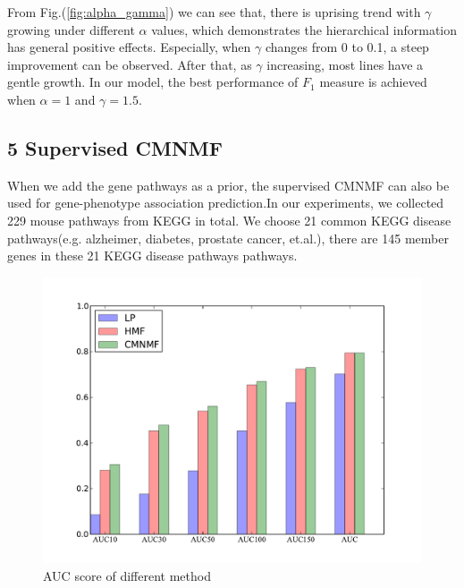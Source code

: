 \documentclass{bmcart}
\begin{document}
From Fig.(\ref{fig:alpha_gamma}) we can see that, there is uprising trend with $\gamma$ growing under different $\alpha$ values, which demonstrates the hierarchical information has general positive effects. Especially, when $\gamma$ changes from 0 to 0.1, a steep improvement can be observed. After that, as $\gamma$ increasing, most lines have a gentle growth. In our model, the best performance of $F_1$ measure is achieved when $\alpha=1$ and $\gamma = 1.5$.

\subsection*{\textbf{5 Supervised CMNMF}}
When we add the gene pathways as a prior, the supervised CMNMF can also be used for gene-phenotype association prediction.In our experiments, we collected 229 mouse pathways from KEGG in total. We choose 21 common KEGG disease pathways(e.g. alzheimer, diabetes, prostate cancer, et.al.), there are 145 member genes in these 21 KEGG disease pathways pathways.
\begin{figure}[!h]
  \begin{minipage}[t]{0.7\linewidth}
    \includegraphics[width=\linewidth,origin = l]{DrawPictures/AUC.pdf}
  \end{minipage}
  \label{fig:AUC}
  \caption{AUC score of different method}
\end{figure}
\end{document}
